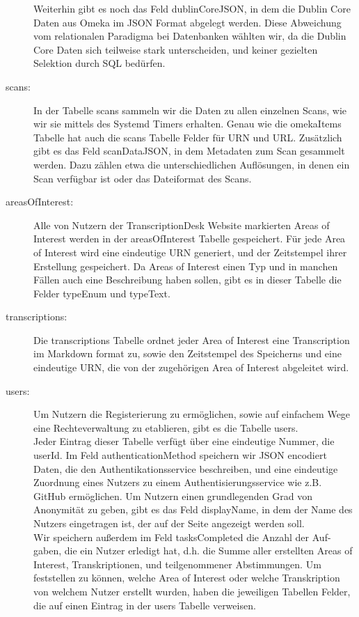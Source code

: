 \documentclass{article}
\begin{document}
\begin{description}
    Weiterhin gibt es noch das Feld dublinCoreJSON,
    in dem die Dublin Core Daten aus Omeka im JSON Format abgelegt werden.
    Diese Abweichung vom relationalen Paradigma bei Datenbanken wählten wir,
    da die Dublin Core Daten sich teilweise stark unterscheiden,
    und keiner gezielten Selektion durch SQL bedürfen.
\item[scans:]
    In der Tabelle scans sammeln wir die Daten zu allen einzelnen Scans,
    wie wir sie mittels des Systemd Timers erhalten.
    Genau wie die omekaItems Tabelle hat auch die scans Tabelle Felder für URN und URL.
    Zusätzlich gibt es das Feld scanDataJSON,
    in dem Metadaten zum Scan gesammelt werden.
    Dazu zählen etwa die unterschiedlichen Auflösungen,
    in denen ein Scan verfügbar ist
    oder das Dateiformat des Scans.
\item[areasOfInterest:]
    Alle von Nutzern der TranscriptionDesk Website markierten Areas of Interest werden in der areasOfInterest Tabelle gespeichert.
    Für jede Area of Interest wird eine eindeutige URN generiert,
    und der Zeitstempel ihrer Erstellung gespeichert.
    Da Areas of Interest einen Typ und in manchen Fällen auch eine Beschreibung haben sollen,
    gibt es in dieser Tabelle die Felder typeEnum und typeText.
\item[transcriptions:]
    Die transcriptions Tabelle ordnet jeder Area of Interest eine Transcription im Markdown format zu,
    sowie den Zeitstempel des Speicherns und eine eindeutige URN, die von der zugehörigen Area of Interest abgeleitet wird.
\item[users:]
    Um Nutzern die Registerierung zu ermöglichen,
    sowie auf einfachem Wege eine Rechteverwaltung zu etablieren,
    gibt es die Tabelle users.\\
    Jeder Eintrag dieser Tabelle verfügt über eine eindeutige Nummer, die userId.
    Im Feld authenticationMethod speichern wir JSON encodiert Daten,
    die den Authentikationsservice beschreiben,
    und eine eindeutige Zuordnung eines Nutzers zu einem Authentisierungsservice wie z.B. GitHub ermöglichen.
    Um Nutzern einen grundlegenden Grad von Anonymität zu geben,
    gibt es das Feld displayName,
    in dem der Name des Nutzers eingetragen ist,
    der auf der Seite angezeigt werden soll.\\
    Wir speichern außerdem im Feld tasksCompleted
    die Anzahl der Auf-gaben, die ein Nutzer erledigt hat,
    d.h. die Summe aller erstellten Areas of Interest, Transkriptionen,
    und teilgenommener Abstimmungen.
    Um feststellen zu können, welche Area of Interest oder welche Transkription
    von welchem Nutzer erstellt wurden,
    haben die jeweiligen Tabellen Felder,
    die auf einen Eintrag in der users Tabelle verweisen.
\end{description}
\end{document}
